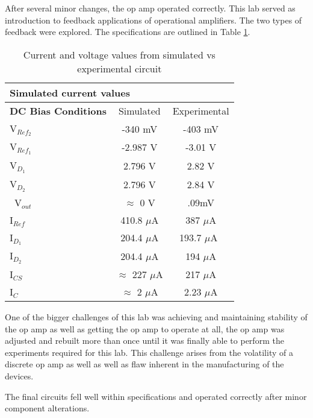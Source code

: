 
After several minor changes, the op amp operated correctly. This lab served as introduction to feedback applications of operational amplifiers. The two types of feedback were explored. The specifications are outlined in Table \ref{tab:specs}.

\begin{table}[H]
	\centering
	\caption{Current and voltage values from simulated vs experimental circuit}
	\label{tab:specs}
	\begin{tabular}{|l|c|c|}
		\hline
		\multicolumn{3}{|l|}{Simulated current values}                            \\ \hline
		\textbf{DC Bias Conditions} & Simulated & Experimental        \\ \hline
		V$_{Ref_2}$ & -340 mV      & -403 mV                                        \\ \hline
		V$_{Ref_1}$ & -2.987 V       & -3.01 V                        	   \\ \hline
		V$_{D_1}$ & 2.796 V          & 2.82 V                              	       	       \\ \hline
		V$_{D_2}$  & 2.796 V                       & 2.84 V                        	   \\ \hline\
		V$_{out}$ & $\approx$ 0 V				& .09mV 						 \\ \hline
		I$_{Ref}$ & 410.8 $\mu$A            & 387 $\mu$A                                       \\ \hline
		I$_{D_1}$ & 204.4 $\mu$A              &  193.7 $\mu$A\                                    \\ \hline
		I$_{D_2}$ & 204.4 $\mu$A                  & 194 $\mu$A                                \\ \hline
		I$_{CS}$  & $\approx$  227 $\mu$A               & 217 $\mu$A                            \\ \hline
		I$_{C}$   & $\approx$ 2  $\mu$A				& 2.23 $\mu$A 						 \\	\hline

	\end{tabular}
\end{table}


One of the bigger challenges of this lab was achieving and maintaining stability of the op amp as well as getting the op amp to operate at all, the op amp was adjusted and rebuilt more than once until it was finally able to perform the experiments required for this lab. This challenge arises from the volatility of a discrete op amp as well as well as flaw inherent in the manufacturing of the devices.

The final circuits fell well within specifications and operated correctly after minor component alterations.



